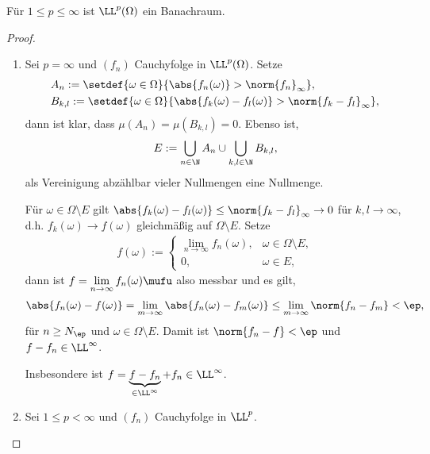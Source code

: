 \begin{prop}
\label{prop:3.73}
Für $1\le p\le \infty$ ist $\LL^p(\Omega)$ ein Banachraum.\fishhere
\end{prop}
\begin{proof}
\begin{enumerate}[label=\arabic{*}.)]
  \item Sei $p=\infty$ und $(f_n)$ Cauchyfolge in $\LL^p(\Omega)$. Setze
\begin{align*}
&A_n :=\setdef{\omega\in\Omega}{\abs{f_n(\omega)} > \norm{f_n}_\infty},\\
&B_{k,l} :=
\setdef{\omega\in\Omega}{\abs{f_k(\omega)-f_l(\omega)}>\norm{f_k-f_l}_\infty},
\end{align*}
dann ist klar, dass $\mu(A_n) = \mu(B_{k,l}) = 0$. Ebenso ist,
\begin{align*}
E := \bigcup_{n\in\N} A_n \cup \bigcup_{k,l\in\N} B_{k,l},
\end{align*}
als Vereinigung abzählbar vieler Nullmengen eine Nullmenge.

Für $\omega\in\Omega\setminus E$ gilt $\abs{f_k(\omega)-f_l(\omega)} \le
\norm{f_k-f_l}_\infty\to 0$ für $k,l\to \infty$, d.h. $f_k(\omega)\to
f(\omega)$ gleichmäßig auf $\Omega\setminus E$. Setze
\begin{align*}
f(\omega) := \begin{cases}
\lim\limits_{n\to\infty} f_n(\omega),& \omega\in\Omega\setminus E,\\
0,& \omega\in E,
\end{cases}
\end{align*}
dann ist $f = \lim\limits_{n\to\infty} f_n(\omega)\mufu$ also messbar und
es gilt,
\begin{align*}
\abs{f_n(\omega)-f(\omega)} = \lim\limits_{m\to\infty} \abs{f_n(\omega) -
f_m(\omega)} \le \lim\limits_{m\to\infty} \norm{f_n - f_m} < \ep,
\end{align*}
für $n\ge N_\ep$ und $\omega\in\Omega\setminus E$. Damit ist 
$\norm{f_n-f}<\ep$ und $f-f_n \in \LL^\infty$.

Insbesondere ist $f = \underbrace{f-f_n}_{\in\LL^\infty} + f_n \in \LL^\infty$.
\item Sei $1\le p < \infty$ und $(f_n)$ Cauchyfolge in $\LL^p$.


\end{enumerate}
\end{proof}
